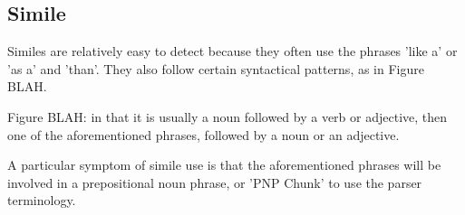 \subsection{Simile}

Similes are relatively easy to detect because they often use the phrases 'like a' or 'as a' and 'than'. They also follow certain syntactical patterns, as in Figure BLAH.

Figure BLAH: in that it is usually a noun followed by a verb or adjective, then one of the aforementioned phrases, followed by a noun or an adjective.

A particular symptom of simile use is that the aforementioned phrases will be involved in a prepositional noun phrase, or 'PNP Chunk' to use the parser terminology.




